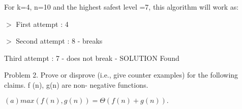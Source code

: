 \documentclass[letterpaper,portrait,12pt]{article}
\begin{document}
\begin{flushleft}

\end{flushleft}


\begin{flushleft}
For k=4, n=10 and the highest safest level =7, this algorithm will work as:
\end{flushleft}


\begin{flushleft}
 $>$ First attempt : 4
\end{flushleft}


\begin{flushleft}
 $>$ Second attempt : 8 - breaks
\end{flushleft}


\begin{flushleft}
	Third attempt : 7 - does not break - SOLUTION Found
\end{flushleft}


\begin{flushleft}

\end{flushleft}


\begin{flushleft}
Problem 2. Prove or disprove (i.e., give counter examples) for the following claims. f (n), g(n) are non- negative functions.
\end{flushleft}


\begin{flushleft}
$(a) max(f (n), g(n)) = \Theta(f (n) + g(n)).$
\end{flushleft}


\begin{flushleft}

\end{flushleft}


\begin{flushleft}

\end{flushleft}


\begin{flushleft}

\end{flushleft}


\begin{flushleft}

\end{flushleft}


\begin{flushleft}

\end{flushleft}
\end{document}
